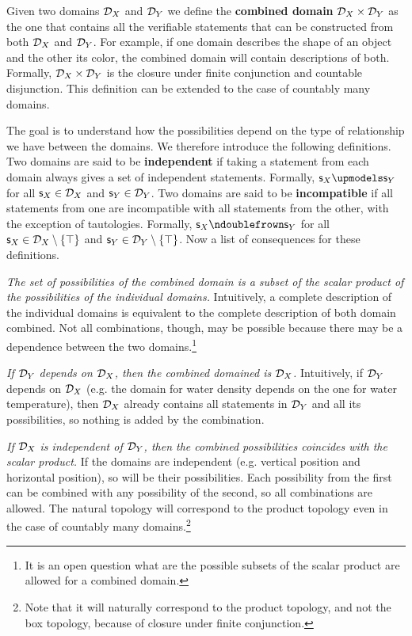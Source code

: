 \documentclass[twocolumn]{article}
\begin{document}
Given two domains $\mathcal{D}_X$ and $\mathcal{D}_Y$ we define the \textbf{combined domain} $\mathcal{D}_X \times \mathcal{D}_Y$ as the one that contains all the verifiable statements that can be constructed from both $\mathcal{D}_X$ and $\mathcal{D}_Y$. For example, if one domain describes the shape of an object and the other its color, the combined domain will contain descriptions of both. Formally, $\mathcal{D}_X \times \mathcal{D}_Y$ is the closure under finite conjunction and countable disjunction. This definition can be extended to the case of countably many domains.

The goal is to understand how the possibilities depend on the type of relationship we have between the domains. We therefore introduce the following definitions. Two domains are said to be \textbf{independent} if taking a statement from each domain always gives a set of independent statements. Formally, $\stmt_X \indep \stmt_Y$ for all $\mathsf{s}_X \in \mathcal{D}_X$ and $\mathsf{s}_Y \in \mathcal{D}_Y$. Two domains are said to be \textbf{incompatible} if all statements from one are incompatible with all statements from the other, with the exception of tautologies. Formally, $\stmt_X \ncomp \stmt_Y$ for all $\mathsf{s}_X \in \mathcal{D}_X \setminus \{\top\}$ and $\mathsf{s}_Y \in \mathcal{D}_Y \setminus \{\top\}$. Now a list of consequences for these definitions.

\textit{The set of possibilities of the combined domain is a subset of the scalar product of the possibilities of the individual domains.} Intuitively, a complete description of the individual domains is equivalent to the complete description of both domain combined. Not all combinations, though, may be possible because there may be a dependence between the two domains.\footnote{It is an open question what are the possible subsets of the scalar product are allowed for a combined domain.}

\textit{If $\mathcal{D}_Y$ depends on $\mathcal{D}_X$, then the combined domained is $\mathcal{D}_X$.} Intuitively, if $\mathcal{D}_Y$ depends on $\mathcal{D}_X$ (e.g. the domain for water density depends on the one for water temperature), then $\mathcal{D}_X$ already contains all statements in $\mathcal{D}_Y$ and all its possibilities, so nothing is added by the combination. 

\textit{If $\mathcal{D}_X$ is independent of $\mathcal{D}_Y$, then the combined possibilities coincides with the scalar product.} If the domains are independent (e.g. vertical position and horizontal position), so will be their possibilities. Each possibility from the first can be combined with any possibility of the second, so all combinations are allowed. The natural topology will correspond to the product topology even in the case of countably many domains.\footnote{Note that it will naturally correspond to the product topology, and not the box topology, because of closure under finite conjunction.}
\end{document}
